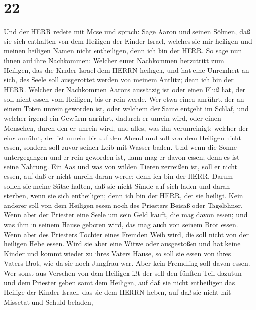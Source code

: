 \hypertarget{section-21}{%
\section{22}\label{section-21}}

 Und der HERR redete mit Mose und sprach:  Sage
Aaron und seinen Söhnen, daß sie sich enthalten von dem Heiligen der
Kinder Israel, welches sie mir heiligen und meinen heiligen Namen nicht
entheiligen, denn ich bin der HERR.  So sage nun ihnen auf
ihre Nachkommen: Welcher eurer Nachkommen herzutritt zum Heiligen, das
die Kinder Israel dem HERRN heiligen, und hat eine Unreinheit an sich,
des Seele soll ausgerottet werden von meinem Antlitz; denn ich bin der
HERR.  Welcher der Nachkommen Aarons aussätzig ist oder
einen Fluß hat, der soll nicht essen vom Heiligen, bis er rein werde.
Wer etwa einen anrührt, der an einem Toten unrein geworden ist, oder
welchem der Same entgeht im Schlaf,  und welcher irgend ein
Gewürm anrührt, dadurch er unrein wird, oder einen Menschen, durch den
er unrein wird, und alles, was ihn verunreinigt:  welcher
der eins anrührt, der ist unrein bis auf den Abend und soll von dem
Heiligen nicht essen, sondern soll zuvor seinen Leib mit Wasser baden.
 Und wenn die Sonne untergegangen und er rein geworden ist,
dann mag er davon essen; denn es ist seine Nahrung.  Ein Aas
und was von wilden Tieren zerreißen ist, soll er nicht essen, auf daß er
nicht unrein daran werde; denn ich bin der HERR.  Darum
sollen sie meine Sätze halten, daß sie nicht Sünde auf sich laden und
daran sterben, wenn sie sich entheiligen; denn ich bin der HERR, der sie
heiligt.  Kein anderer soll von dem Heiligen essen noch des
Priesters Beisaß oder Tagelöhner.  Wenn aber der Priester
eine Seele um sein Geld kauft, die mag davon essen; und was ihm in
seinem Hause geboren wird, das mag auch von seinem Brot essen.
 Wenn aber des Priesters Tochter eines Fremden Weib wird,
die soll nicht von der heiligen Hebe essen.  Wird sie aber
eine Witwe oder ausgestoßen und hat keine Kinder und kommt wieder zu
ihres Vaters Hause, so soll sie essen von ihres Vaters Brot, wie da sie
noch Jungfrau war. Aber kein Fremdling soll davon essen. 
Wer sonst aus Versehen von dem Heiligen ißt der soll den fünften Teil
dazutun und dem Priester geben samt dem Heiligen,  auf daß
sie nicht entheiligen das Heilige der Kinder Israel, das sie dem HERRN
heben,  auf daß sie nicht mit Missetat und Schuld beladen,

